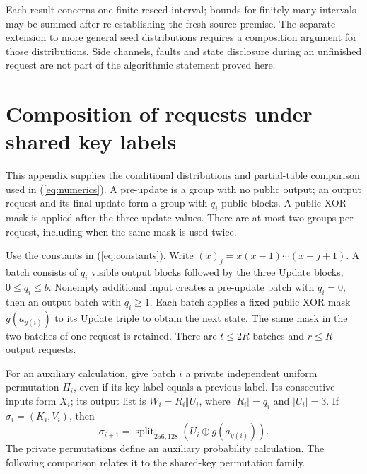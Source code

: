 \documentclass[journal=tosc,preprint,floatrow,nohyperxmp]{iacrtrans}
\numberwithin{lemma}{section}
\numberwithin{proposition}{section}
\newcommand{\fall}[2]{(#1)_{#2}}
\numberwithin{equation}{section}
\theoremstyle{definition}
\numberwithin{definition}{section}
\theoremstyle{plain}
\begin{document}
Each result concerns one finite reseed interval; bounds for finitely many intervals may be summed after re-establishing the fresh source premise. The separate extension to more general seed distributions requires a composition argument for those distributions. Side channels, faults and state disclosure during an unfinished request are not part of the algorithmic statement proved here.

\appendix
\section{Composition of requests under shared key labels}\label{app:composition}
This appendix supplies the conditional distributions and partial-table comparison used in (\ref{eq:numerics}). A pre-update is a group with no public output; an output request and its final update form a group with $q_i$ public blocks. A public XOR mask is applied after the three update values. There are at most two groups per request, including when the same mask is used twice.

Use the constants in (\ref{eq:constants}).
Write $\fall{x}{j}=x(x-1)\cdots(x-j+1)$. A batch consists of $q_i$ visible output blocks followed by the three Update blocks; $0\le q_i\le b$. Nonempty additional input creates a pre-update batch with $q_i=0$, then an output batch with $q_i\ge1$. Each batch applies a fixed public XOR mask $g(a_{y(i)})$ to its Update triple to obtain the next state. The same mask in the two batches of one request is retained. There are $t\le2R$ batches and $r\le R$ output requests.

For an auxiliary calculation, give batch $i$ a private independent uniform permutation $\Pi_i$, even if its key label equals a previous label. Its consecutive inputs form $X_i$; its output list is $W_i=R_i\Vert U_i$, where $|R_i|=q_i$ and $|U_i|=3$. If $\sigma_i=(K_i,V_i)$, then
\begin{equation}
 \sigma_{i+1}=\operatorname{split}_{256,128}(U_i\oplus g(a_{y(i)})).\label{eq:batchstate}
\end{equation}
The private permutations define an auxiliary probability calculation. The following comparison relates it to the shared-key permutation family.
\end{document}
